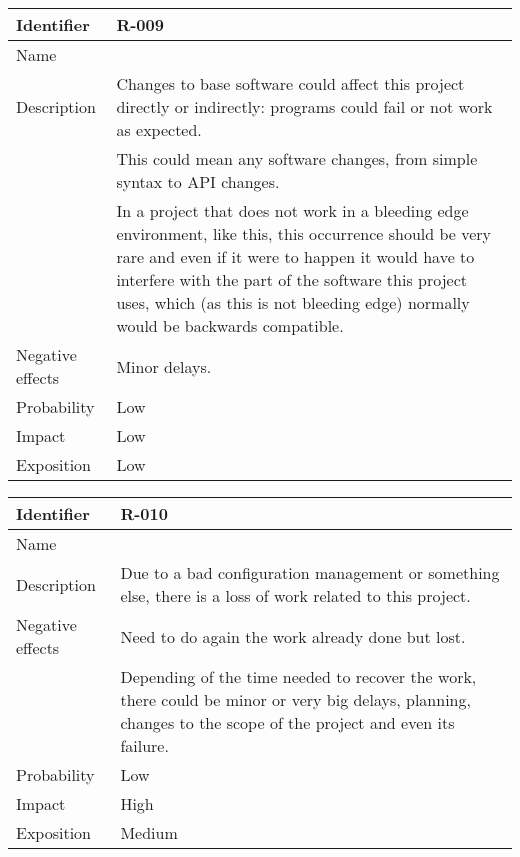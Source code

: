 \begin{table}[H]
	\begin{tabularx}{\textwidth}{|l|X|}
		\hline
		\rowcolor{gray!30}
		Identifier & \textbf{R-009} \\ \hline
		Name & \Rnueve \\ \hline
		Description
			& Changes to base software could affect this project directly or indirectly: programs could fail or not work as expected. \\
			& This could mean any software changes, from simple syntax to API changes. \\
			& In a project that does not work in a bleeding edge environment, like this, this occurrence should be very rare and even if it were to happen it would have to interfere with the part of the software this project uses, which (as this is not bleeding edge) normally would be backwards compatible.\\ \hline
		Negative effects
			& Minor delays. \\ \hline
		Probability & Low\\ \hline
		Impact & Low \\ \hline
		Exposition &  Low\\ \hline
	\end{tabularx}
\end{table}

\begin{table}[H]
	\begin{tabularx}{\textwidth}{|l|X|}
		\hline
		\rowcolor{gray!30}
		Identifier & \textbf{R-010} \\ \hline
		Name & \Rdiez \\ \hline
		Description & Due to a bad configuration management or something else, there is a loss of work related to this project.\\ \hline
		Negative effects
			& Need to do again the work already done but lost.\\
			& Depending of the time needed to recover the work, there could be minor or very big delays, planning, changes to the scope of the project and even its failure.  \\ \hline
		Probability & Low\\ \hline
		Impact &  High\\ \hline
		Exposition &  Medium\\ \hline
	\end{tabularx}
\end{table}

